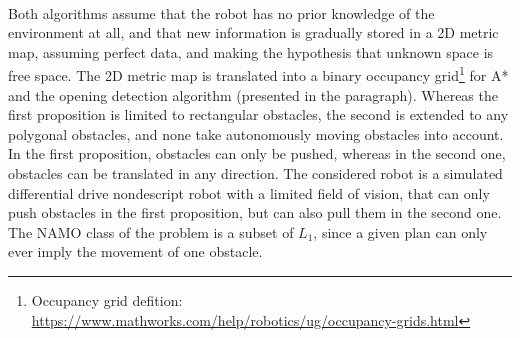 \paragraph{} Both algorithms assume that the robot has no prior knowledge of the environment at all, and that new information is gradually stored in a 2D metric map, assuming perfect data, and making the hypothesis that unknown space is free space. The 2D metric map is translated into a binary occupancy grid\footnote{Occupancy grid defition: \url{https://www.mathworks.com/help/robotics/ug/occupancy-grids.html}} for A* and the opening detection algorithm (presented in the  paragraph). Whereas the first proposition is limited to rectangular obstacles, the second is extended to any polygonal obstacles, and none take autonomously moving obstacles into account. In the first proposition, obstacles can only be pushed, whereas in the second one, obstacles can be translated in any direction. The considered robot is a simulated differential drive nondescript robot with a limited field of vision, that can only push obstacles in the first proposition, but can also pull them in the second one. The NAMO class of the problem is a subset of $L_1$, since a given plan can only ever imply the movement of one obstacle.

